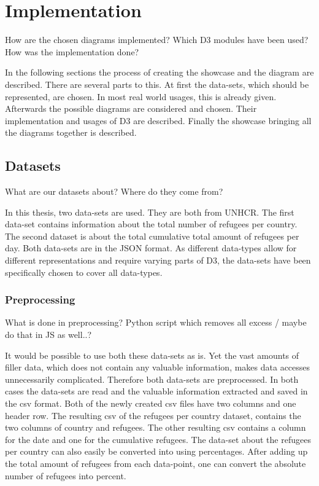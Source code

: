\chapter{Implementation}
How are the chosen diagrams implemented? Which D3 modules have been used? How was the implementation done?

In the following sections the process of creating the showcase and the diagram are described. There are several parts to this. At first the data-sets, which should be represented, are chosen. In most real world usages, this is already given. Afterwards the possible diagrams are considered and chosen. Their implementation and usages of D3 are described. Finally the showcase bringing all the diagrams together is described.

\section{Datasets}
What are our datasets about? Where do they come from?

In this thesis, two data-sets are used. They are both from UNHCR\cite{unhcr}. The first data-set contains information about the total number of refugees per country\cite{unhcr_rpc}. The second dataset is about the total cumulative total amount of refugees per day\cite{unhcr_rpd}. Both data-sets are in the JSON format.
As different data-types allow for different representations and require varying parts of D3, the data-sets have been specifically chosen to cover all data-types.

\subsection{Preprocessing}
What is done in preprocessing? Python script which removes all excess / maybe do that in JS as well..?

It would be possible to use both these data-sets as is. Yet the vast amounts of filler data, which does not contain any valuable information, makes data accesses unnecessarily complicated. Therefore both data-sets are preprocessed. In both cases the data-sets are read and the valuable information extracted and saved in the csv format. Both of the newly created csv files have two columns and one header row. The resulting csv of the refugees per country dataset, contains the two columns of country and refugees. The other resulting csv contains a column for the date and one for the cumulative refugees. 
The data-set about the refugees per country can also easily be converted into using percentages. After adding up the total amount of refugees from each data-point, one can convert the absolute number of refugees into percent.

